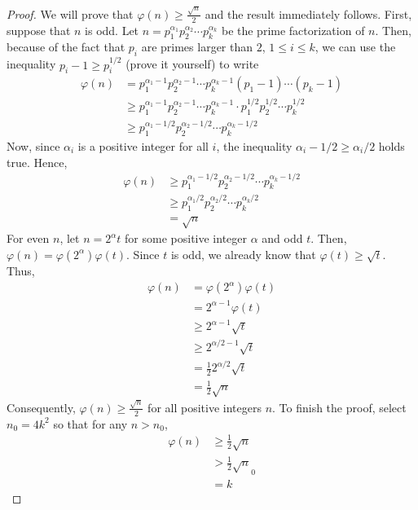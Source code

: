 	\begin{proof}
		We will prove that $\varphi(n) \geq \frac{\sqrt{n}}{2}$ and the result immediately follows. First, suppose that $n$ is odd. Let $n=p_1^{\alpha_1} p_2^{\alpha_2} \cdots p_k^{\alpha_k}$ be the prime factorization of $n$. Then, because of the fact that $p_i$ are primes larger than $2$, $1 \leq i \leq k$, we can use the inequality $p_i-1 \geq p_i^{1/2}$ (prove it yourself) to write
			\begin{align*}
				\varphi(n) &= p_1^{\alpha_1-1} p_2^{\alpha_2-1} \cdots p_k^{\alpha_k-1} \left( p_1 -1 \right) \cdots \left( p_k -1 \right)\\
			   &\geq p_1^{\alpha_1-1} p_2^{\alpha_2-1} \cdots p_k^{\alpha_k-1} \cdot p_1^{1/2} p_2^{1/2} \cdots p_k^{1/2}\\
			   &\geq p_1^{\alpha_1-1/2} p_2^{\alpha_2-1/2} \cdots p_k^{\alpha_k-1/2}
			\end{align*}
		Now, since $\alpha_i$ is a positive integer for all $i$, the inequality $\alpha_i - 1/2 \geq \alpha_i/2$ holds true. Hence,
			\begin{align*}
				\varphi(n)  &\geq p_1^{\alpha_1-1/2} p_2^{\alpha_2-1/2} \cdots p_k^{\alpha_k-1/2}\\
							&\geq p_1^{\alpha_1/2} p_2^{\alpha_2/2} \cdots p_k^{\alpha_k/2}\\
							&= \sqrt n
			\end{align*}
		For even $n$, let $n=2^\alpha t$ for some positive integer $\alpha$ and odd $t$. Then, $\varphi(n)=\varphi(2^\alpha)\varphi(t)$. Since $t$ is odd, we already know that $\varphi(t) \geq \sqrt t$. Thus,
			\begin{align*}
				\varphi(n) &= \varphi(2^\alpha)\varphi(t)\\
			   &= 2^{\alpha -1} \varphi(t)\\
			   &\geq 2^{\alpha -1} \sqrt t\\
			   &\geq 2^{\alpha/2 -1} \sqrt t\\
			   &= \frac{1}{2}2^{\alpha/2} \sqrt t\\
			   &= \frac{1}{2} \sqrt n
			\end{align*}
		Consequently, $\varphi(n) \geq \frac{\sqrt n}{2}$ for all positive integers $n$. To finish the proof, select $n_0=4k^2$ so that for any $n>n_0$,
			\begin{align*}
				\varphi(n) &\geq \frac{1}{2} \sqrt n\\
			   &> \frac{1}{2} \sqrt n_0\\
			   &= k
			\end{align*}
	\end{proof}

